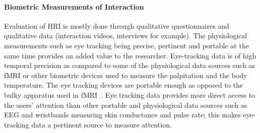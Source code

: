 \documentclass{sig-alternate}
\begin{document}
%
%
%
%


\paragraph{Biometric Measurements of Interaction}

Evaluation of HRI is mostly done through qualitative questionnaires and
qualitative data (interaction videos, interviews for example). The physiological
measurements such as eye tracking being precise, pertinent and portable at the
same time provides an added value to the researcher.  Eye-tracking data is of
high temporal precision as compared to some of the physiological data sources
such as fMRI or other biometric devices used to measure the palpitation and the
body temperature. The eye tracking devices are portable enough as opposed to the
bulky apparatus used in fMRI~\cite{rosenthal2013neural}. Eye tracking data
provides more direct access to the users' attention than other portable and
physiological data sources such as EEG and wristbands measuring skin conductance
and pulse rate; this makes eye-tracking data a pertinent source to measure
attention.
\end{document}
